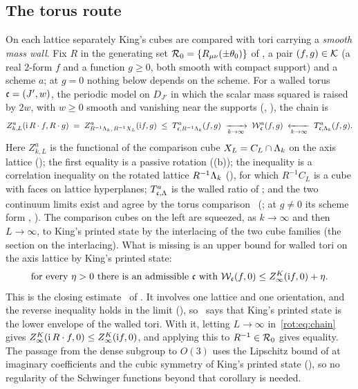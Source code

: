 \subsection{The torus route}

On each lattice separately King's cubes are compared with tori carrying a \emph{smooth mass wall}. Fix $R$ in the generating set $\mathcal R_0=\{R_{\mu\nu}(\pm\theta_0)\}$ of , a pair $(f,g)\in\mathcal K$ (a real $2$-form $f$ and a function $g\ge0$, both smooth with compact support) and a scheme $a$; at $g=0$ nothing below depends on the scheme. For a walled torus $\mathfrak c=(J',w)$, the periodic model on $D_{J'}$ in which the scalar mass squared is raised by $2w$, with $w\ge0$ smooth and vanishing near the supports (, ), the chain is
\begin{equation}\label{rot:eq:chain}
Z^a_{k,L}(\mathrm i\,R\cdot f,R\cdot g)\;=\;Z^a_{R^{-1}\Lambda_k,\,R^{-1}X_L}(\mathrm if,g)\;\le\;T^{a}_{\mathfrak c,R^{-1}\Lambda_k}(f,g)
\;\xrightarrow[k\to\infty]{}\;\mathcal W^a_{\mathfrak c}(f,g)\;\xleftarrow[k\to\infty]{}\;T^{a}_{\mathfrak c,\Lambda_k}(f,g).
\end{equation}
Here $Z^a_{k,L}$ is the functional of the comparison cube $X_L=C_L\cap\Lambda_k$ on the axis lattice (); the first equality is a passive rotation ((b)); the inequality is a correlation inequality on the rotated lattice $R^{-1}\Lambda_k$ (), for which $R^{-1}C_L$ is a cube with faces on lattice hyperplanes; $T^{a}_{\mathfrak c,\Lambda}$ is the walled ratio of ; and the two continuum limits exist and agree by the torus comparison \Kz\ (; at $g\ne0$ its scheme form \Ka, ). The comparison cubes on the left are squeezed, as $k\to\infty$ and then $L\to\infty$, to King's printed state by the interlacing of the two cube families (the section on the interlacing). What is missing is an upper bound for walled tori on the axis lattice by King's printed state:
\begin{equation}\label{rot:eq:missing}
\text{for every }\eta>0\text{ there is an admissible }\mathfrak c\text{ with }\mathcal W_{\mathfrak c}(f,0)\le Z^{K}_{\infty}(\mathrm if,0)+\eta .
\end{equation}
This is the closing estimate \TIz\ of . It involves one lattice and one orientation, and the reverse inequality holds in the limit (), so \TIz\ says that King's printed state is the lower envelope of the walled tori. With it, letting $L\to\infty$ in~\eqref{rot:eq:chain} gives $Z^{K}_{\infty}(\mathrm i\,R\cdot f,0)\le Z^{K}_{\infty}(\mathrm if,0)$, and applying this to $R^{-1}\in\mathcal R_0$ gives equality. The passage from the dense subgroup to $O(3)$ uses the Lipschitz bound of  at imaginary coefficients and the cubic symmetry of King's printed state (), so no regularity of the Schwinger functions beyond that corollary is needed.

